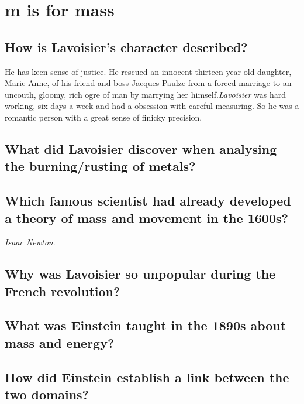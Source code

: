 %

\section{m is for mass}

\subsection*{How is Lavoisier’s character described?}
He has keen sense of justice. He rescued an innocent thirteen-year-old daughter, Marie Anne, of his friend and boss Jacques Paulze from a forced marriage to an uncouth, gloomy, rich ogre of man by marrying her himself.\emph{Lavoisier} was hard working, six days a week and had a obsession with careful measuring. So he was a romantic person with a great sense of finicky precision.


\subsection*{What did Lavoisier discover when analysing the burning/rusting of metals?}

\subsection*{Which famous scientist had already developed a theory of mass and movement in the 1600s?}
\emph{Isaac Newton}. 

\subsection*{Why was Lavoisier so unpopular during the French revolution?}

\subsection*{What was Einstein taught in the 1890s about mass and energy?}

\subsection*{How did Einstein establish a link between the two domains?}